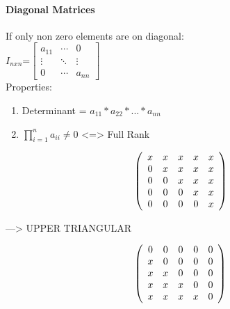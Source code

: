 \documentclass[]{article}
\providecommand{\tightlist}{%
  \setlength{\itemsep}{0pt}\setlength{\parskip}{0pt}}
\let\oldparagraph\paragraph
\renewcommand{\paragraph}[1]{\oldparagraph{#1}\mbox{}}
\begin{document}
\paragraph{\texorpdfstring{Diagonal Matrices\\
}{Diagonal Matrices }}\label{diagonal-matrices}

If only non zero elements are on diagonal:\\

\(I_{nxn}\)=\(\begin{bmatrix} a_{11} & \cdots & 0 \\ \vdots & \ddots & \vdots \\ 0 & \cdots & a_{nn} \end{bmatrix}\)\\
 Properties:

\begin{enumerate}
\def\labelenumi{\alph{enumi})}
\tightlist
\item
  Determinant = \(a_{11}*a_{22}*...*a_{nn}\)\\
\item
  \(\prod_{i=1}^{n}a_{ii} \neq 0\) \textless{}=\textgreater{} Full
  Rank\\
\end{enumerate}

\begin{equation}
  \left(
    \begin{array}{*5{c}}
     x & x & x & x & x \\
     0 & x & x & x & x \\
     0 &  0 & x & x & x \\
     0 &  0 &  0 & x & x \\
     0 &  0 &  0 &  0 & x \\
  \end{array}\right)
\end{equation}

---\textgreater{} UPPER TRIANGULAR

\begin{equation}
  \left(
    \begin{array}{*5{c}}
     0 & 0 & 0 & 0 & 0 \\
     x & 0 & 0 & 0 & 0 \\
     x &  x & 0 & 0 & 0 \\
     x &  x &  x & 0 & 0 \\
     x &  x &  x &  x & 0 \\
  \end{array}\right)
\end{equation}
\end{document}
